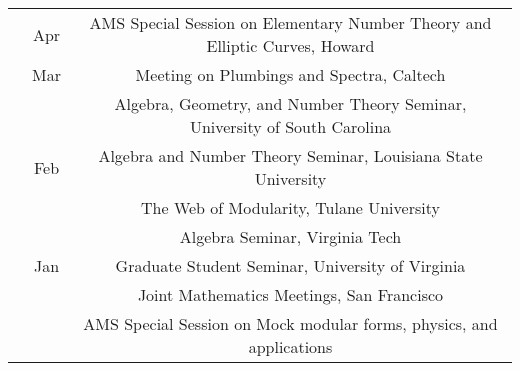 \documentclass[11pt]{amsart}
\theoremstyle{remark}
\begin{document}
{{{\begin{tabular}{ c c c }
& Apr & \hspace{-.16in} AMS Special Session on Elementary Number Theory and Elliptic Curves, Howard \\
& Mar & \hspace{-2.86in} Meeting on Plumbings and Spectra, Caltech \\
&& \hspace{-.34in} Algebra, Geometry, and Number Theory Seminar, University of South Carolina\\
& Feb & \hspace{-1.3in} Algebra and Number Theory Seminar, Louisiana State University \\
&& \hspace{-2.96in} The Web of Modularity, Tulane University\\
&& \hspace{-3.76in} Algebra Seminar, Virginia Tech \\
& Jan & \hspace{-2.44in}Graduate Student Seminar, University of Virginia\\
&& \hspace{-.44in} \hspace{-2.49in} Joint Mathematics Meetings, San Francisco \\
& & \hspace{-.89in} AMS Special Session on Mock modular forms, physics, and applications \\

\end{tabular}}}}
\end{document}
